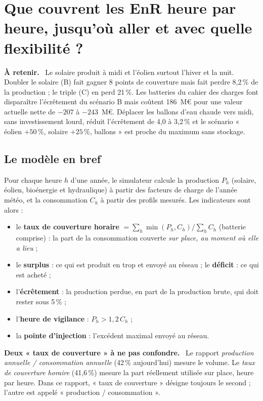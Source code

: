 \documentclass[11pt, a4paper]{report}
\newenvironment{retenir}{\par\medskip\noindent\textbf{À retenir.}\ }{\par\medskip}
\newenvironment{definition}[1]{\par\medskip\noindent\textbf{#1.}\ }{\par\medskip}
\newcommand{\pct}{\,\%}
\begin{document}
\chapter{Que couvrent les EnR heure par heure, jusqu'où aller et avec quelle flexibilité ?}
\label{chap:flex}

\begin{retenir}
Le solaire produit à midi et l'éolien surtout l'hiver et la nuit. Doubler le solaire (B) fait gagner 8 points de couverture mais fait perdre 8,2\pct{} de la production ; le triple (C) en perd 21\pct. Les batteries du cahier des charges font disparaître l'écrêtement du scénario B mais coûtent 186~M\euro{} pour une valeur actuelle nette de $-207$ à $-243$~M\euro. Déplacer les ballons d'eau chaude vers midi, sans investissement lourd, réduit l'écrêtement de 4,0 à 3,2\pct{} et le scénario « éolien $+50\pct$, solaire $+25\pct$, ballons » est proche du maximum sans stockage.
\end{retenir}

\section{Le modèle en bref}

Pour chaque heure $h$ d'une année, le simulateur calcule la production $P_h$ (solaire, éolien, bioénergie et hydraulique) à partir des facteurs de charge de l'année météo, et la consommation $C_h$ à partir des profils mesurés. Les indicateurs sont alors :
\begin{itemize}
  \item le \textbf{taux de couverture horaire} $= \sum_h \min(P_h, C_h) \big/ \sum_h C_h$ (batterie comprise) : la part de la consommation couverte \emph{sur place, au moment où elle a lieu} ;
  \item le \textbf{surplus} : ce qui est produit en trop et envoyé au réseau ; le \textbf{déficit} : ce qui est acheté ;
  \item l'\textbf{écrêtement} : la production perdue, en part de la production brute, qui doit rester sous 5\pct{} ;
  \item l'\textbf{heure de vigilance} : $P_h > 1{,}2\,C_h$ ;
  \item la \textbf{pointe d'injection} : l'excédent maximal envoyé au réseau.
\end{itemize}

\begin{definition}{Deux « taux de couverture » à ne pas confondre}
Le rapport \emph{production annuelle / consommation annuelle} (42\pct{} aujourd'hui) mesure le volume. Le \emph{taux de couverture horaire} (41,6\pct) mesure la part réellement utilisée sur place, heure par heure. Dans ce rapport, « taux de couverture » désigne toujours le second ; l'autre est appelé « production / consommation ».
\end{definition}
\end{document}
